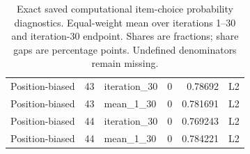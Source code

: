 \begin{table}[htbp!]
\begin{tabular}{lrlrrl}
Position-biased & 43 & iteration\_30 & 0 & 0.78692 & L2 \\
Position-biased & 43 & mean\_1\_30 & 0 & 0.781691 & L2 \\
Position-biased & 44 & iteration\_30 & 0 & 0.769243 & L2 \\
Position-biased & 44 & mean\_1\_30 & 0 & 0.784221 & L2 \\
\hline
\end{tabular}
\caption{Exact saved computational item-choice probability diagnostics. Equal-weight mean over iterations 1--30 and iteration-30 endpoint. Shares are fractions; share gaps are percentage points. Undefined denominators remain missing.}
\label{chap:results:tab:rq2_computational_order_sensitivity}
\end{table}
